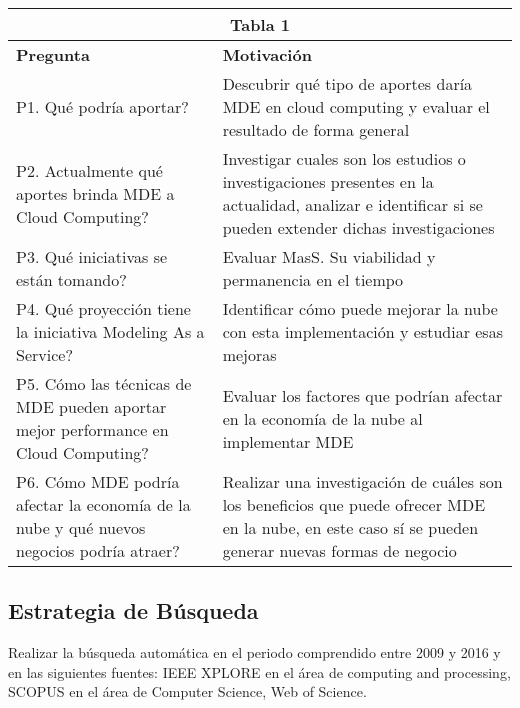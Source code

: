 \documentclass{llncs}
\begin{document}
\begin{tabular}{  | p{5cm} | p{7cm}  | }
  \hline
  \multicolumn{2}{|c|}{\bf Tabla 1} \\
  \hline
  \bf Pregunta & \bf Motivación \\
  \hline
  P1. Qué podría aportar?  & Descubrir qué tipo de aportes daría MDE en cloud computing y evaluar el resultado de forma general\\
  \hline
  P2. Actualmente qué aportes brinda MDE a Cloud Computing? & Investigar cuales son los estudios o investigaciones presentes en la actualidad, analizar e identificar si se pueden extender dichas investigaciones\\
  \hline
  P3. Qué iniciativas se están tomando? & Evaluar MasS. Su viabilidad y permanencia en el tiempo\\
  \hline
  P4. Qué proyección tiene la iniciativa Modeling As a Service? & Identificar cómo puede mejorar la nube con esta implementación y estudiar esas mejoras\\
  \hline
  P5. Cómo las técnicas de MDE pueden aportar mejor performance en Cloud Computing?  & Evaluar los factores que podrían afectar en la economía de la nube al implementar MDE\\
  \hline
  P6. Cómo MDE podría afectar la economía de la nube y qué nuevos negocios podría atraer? & Realizar una investigación de cuáles son los beneficios que puede ofrecer MDE en la nube, en este caso sí se pueden generar nuevas formas de negocio\\
  \hline
\end{tabular}

\subsection{Estrategia de Búsqueda}
Realizar la búsqueda automática  en el periodo comprendido entre 2009 y 2016 y en las siguientes fuentes: IEEE XPLORE en el área de computing and processing, SCOPUS en el área de Computer Science, Web of Science.
\end{document}
